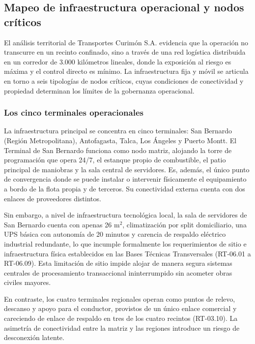 \subsection{Mapeo de infraestructura operacional y nodos críticos}

El análisis territorial de Transportes Curimón S.A. evidencia que la operación no transcurre en un recinto confinado, sino a través de una red logística distribuida en un corredor de 3.000 kilómetros lineales, donde la exposición al riesgo es máxima y el control directo es mínimo. La infraestructura fija y móvil se articula en torno a seis tipologías de nodos críticos, cuyas condiciones de conectividad y propiedad determinan los límites de la gobernanza operacional.

\subsubsection{Los cinco terminales operacionales}

La infraestructura principal se concentra en cinco terminales: San Bernardo (Región Metropolitana), Antofagasta, Talca, Los Ángeles y Puerto Montt. El Terminal de San Bernardo funciona como nodo matriz, alojando la torre de programación que opera 24/7, el estanque propio de combustible, el patio principal de maniobras y la sala central de servidores. Es, además, el único punto de convergencia donde se puede instalar o intervenir físicamente el equipamiento a bordo de la flota propia y de terceros. Su conectividad externa cuenta con dos enlaces de proveedores distintos.

Sin embargo, a nivel de infraestructura tecnológica local, la sala de servidores de San Bernardo cuenta con apenas 26 m$^2$, climatización por split domiciliario, una UPS básica con autonomía de 20 minutos y carencia de respaldo eléctrico industrial redundante, lo que incumple formalmente los requerimientos de sitio e infraestructura física establecidos en las Bases Técnicas Transversales (RT-06.01 a RT-06.09). Esta limitación de sitio impide alojar de manera segura sistemas centrales de procesamiento transaccional ininterrumpido sin acometer obras civiles mayores.

En contraste, los cuatro terminales regionales operan como puntos de relevo, descanso y apoyo para el conductor, provistos de un único enlace comercial y careciendo de enlace de respaldo en tres de los cuatro recintos (RT-03.10). La asimetría de conectividad entre la matriz y las regiones introduce un riesgo de desconexión latente.

